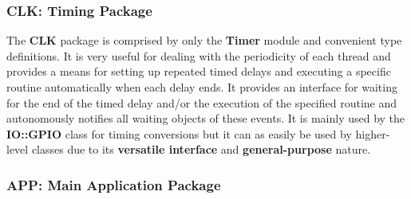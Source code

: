 
%
\subsubsection{CLK: Timing Package}
The \textbf{CLK} package is comprised by only the \textbf{Timer} module and convenient type definitions. It is very useful for dealing with the periodicity of each thread and provides a means for setting up repeated timed delays and executing a specific routine automatically when each delay ends. It provides an interface for waiting for the end of the timed delay and/or the execution of the specified routine and autonomously notifies all waiting objects of these events.
It is mainly used by the \textbf{IO::GPIO} class for timing conversions but it can as easily be used by higher-level classes due to its \textbf{versatile interface} and \textbf{general-purpose} nature.
%

%
\subsubsection{APP: Main Application Package}
%